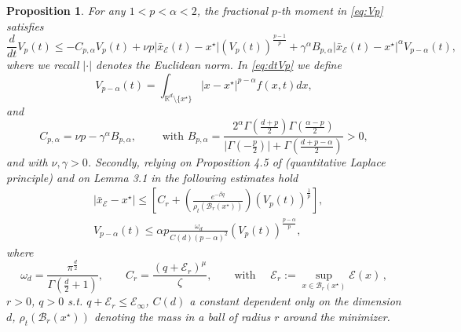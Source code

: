\documentclass[11pt,handout]{article}%
\numberwithin{equation}{section}
\newcommand{\R}{\mathbb R}
\newtheorem{proposition}{Proposition}
\theoremstyle{definition}
\begin{document}
\begin{proposition}\label{prop:proposition1}
	For any $1<p<\alpha<2$, the fractional $p$-th moment in \eqref{eq:Vp} satisfies 
	\begin{equation}\label{eq:dtVp}
		\frac{d}{dt}V_p(t) \leq -C_{p,\alpha} V_p(t) + \nu p \vert \bar{x}_\mathcal{E}(t) - x^\star \vert (V_p(t))^{\frac{p-1}{p}} + \gamma^\alpha B_{p,\alpha} \vert \bar{x}_\mathcal{E}(t) - x^\star \vert^\alpha V_{p-\alpha}(t),
	\end{equation}
	where we recall $\vert \cdot \vert$ denotes the Euclidean norm. In \eqref{eq:dtVp} we define 
	\begin{equation*}
		V_{p-\alpha}(t) = \int_{\R^d\setminus\{x^\star\}} \vert x-x^\star \vert^{p-\alpha} f(x,t) dx,
	\end{equation*} and 
	\begin{equation}\label{eq:Cpalpha}
		C_{p,\alpha} = \nu p - \gamma^\alpha B_{p,\alpha}, \qquad \text{ with }	B_{p,\alpha} = \frac{2^\alpha \Gamma(\frac{d+p}{2}) \Gamma(\frac{\alpha-p}{2})}{\vert \Gamma (-\frac{p}{2})\vert + \Gamma(\frac{d+p-\alpha}{2})}>0,
	\end{equation}
	and with $\nu,\gamma>0$.
	Secondly, relying on Proposition 4.5 of \cite{fornasier2024consensus,fornasier2025pde}  (quantitative Laplace principle) and on Lemma 3.1 in \cite{harjulehto2018pointwise} the following estimates hold
	\begin{equation}\label{eq:estimates_Vp}
		\begin{split}
			&\vert \bar{x}_\mathcal{E}-x^\star\vert  \leq   \left[ C_r  + \left( \frac{e^{-\beta q}}{  \rho_t(\mathcal{B}_r(x^\star)) }\right)  (V_p(t))^{\frac{1}{p}}\right],\\
			&V_{p-\alpha}(t)\leq \alpha p \frac{\omega_d}{C(d)(p-\alpha)^2} (V_p(t))^{\frac{p-\alpha}{p}},  
		\end{split}
	\end{equation}
	where 
	\begin{equation}\label{eq:def_quantitative_laplace}
		\omega_d = \frac{\pi^{\frac{d}{2}}}{\Gamma(\frac{d}{2}+1)},\qquad C_r = \frac{(q+\mathcal{E}_r)^\mu}{\zeta}, \qquad \text{with }\quad  \mathcal{E}_r := \sup_{x\in\mathcal{B}_r(x^\star)} \mathcal{E}(x) \, , 
	\end{equation}
	$r > 0$, $q>0$ s.t. $q+\mathcal{E}_r\leq \mathcal{E}_\infty$, 
	$C(d)$ a constant dependent only on the dimension $d$, $\rho_t(\mathcal{B}_r(x^\star))$ denoting the mass in a ball of radius $r$ around the minimizer. 
\end{proposition}
\end{document}
